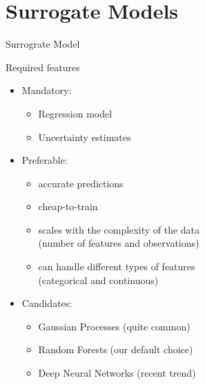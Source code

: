 \section{Surrogate Models}
\begin{frame}[c,fragile]{Surrograte Model}

Required features

\begin{itemize}
	\item Mandatory:
	\begin{itemize}
		\item Regression model
		\item Uncertainty estimates
	\end{itemize}
	\pause
	\item Preferable:
	\begin{itemize}
		\item accurate predictions
		\item cheap-to-train
		\item scales with the complexity of the data\\ (number of features and observations)
		\item can handle different types of features\\ (categorical and continuous)
	\end{itemize}
	\pause
	\medskip
	\item Candidates:
	\begin{itemize}
		\item Gaussian Processes (quite common)
		\item Random Forests (our default choice)
		\item Deep Neural Networks (recent trend)
	\end{itemize}
\end{itemize}

\end{frame}

